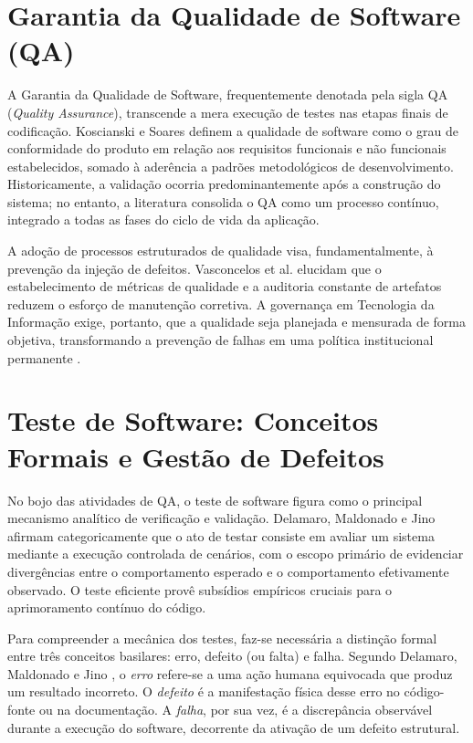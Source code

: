 \section{Garantia da Qualidade de Software (QA)}

A Garantia da Qualidade de Software, frequentemente denotada pela sigla QA (\textit{Quality Assurance}), transcende a mera execução de testes nas etapas finais de codificação. Koscianski e Soares \cite{koscianski2007} definem a qualidade de software como o grau de conformidade do produto em relação aos requisitos funcionais e não funcionais estabelecidos, somado à aderência a padrões metodológicos de desenvolvimento. Historicamente, a validação ocorria predominantemente após a construção do sistema; no entanto, a literatura consolida o QA como um processo contínuo, integrado a todas as fases do ciclo de vida da aplicação.

A adoção de processos estruturados de qualidade visa, fundamentalmente, à prevenção da injeção de defeitos. Vasconcelos et al. \cite{vasconcelos2006} elucidam que o estabelecimento de métricas de qualidade e a auditoria constante de artefatos reduzem o esforço de manutenção corretiva. A governança em Tecnologia da Informação exige, portanto, que a qualidade seja planejada e mensurada de forma objetiva, transformando a prevenção de falhas em uma política institucional permanente \cite{koscianski2007}.

\section{Teste de Software: Conceitos Formais e Gestão de Defeitos}

No bojo das atividades de QA, o teste de software figura como o principal mecanismo analítico de verificação e validação. Delamaro, Maldonado e Jino \cite{delamaro2016} afirmam categoricamente que o ato de testar consiste em avaliar um sistema mediante a execução controlada de cenários, com o escopo primário de evidenciar divergências entre o comportamento esperado e o comportamento efetivamente observado. O teste eficiente provê subsídios empíricos cruciais para o aprimoramento contínuo do código.

Para compreender a mecânica dos testes, faz-se necessária a distinção formal entre três conceitos basilares: erro, defeito (ou falta) e falha. Segundo Delamaro, Maldonado e Jino \cite{delamaro2016}, o \textit{erro} refere-se a uma ação humana equivocada que produz um resultado incorreto. O \textit{defeito} é a manifestação física desse erro no código-fonte ou na documentação. A \textit{falha}, por sua vez, é a discrepância observável durante a execução do software, decorrente da ativação de um defeito estrutural.

